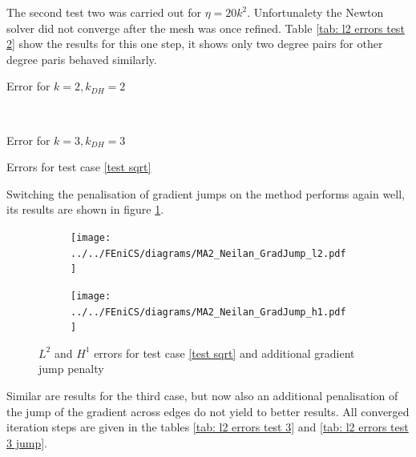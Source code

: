 The second test two was carried out for $\eta=20k^2$. Unfortunalety the Newton solver did not converge after the mesh was once refined. Table \ref{tab: l2 errors test 2} show the results for this one step, it shows only two degree pairs for other degree paris behaved similarly.


\begin{table}[H]
	\begin{subtable}[b]{0.45\textwidth}
		\centering
    	\caption{Error for $k=2, k_{DH}=2$}
   \end{subtable}
   ~
	\begin{subtable}[b]{0.45\textwidth}
		\centering
	\caption{Error for $k=3, k_{DH}=3$}
	\end{subtable}
	\caption{Errors for test case \ref{test sqrt}}
	\label{tab: l2 errors test 2}
\end{table}

Switching the penalisation of gradient jumps on the method performs again well, its results are shown in figure \ref{fig: l2 errors test 2 jump}. 

\begin{figure}[H]
\centering
\begin{subfigure}{\textwidth}
\centering
	\texttt{[image: ../../FEniCS/diagrams/MA2\_Neilan\_GradJump\_l2.pdf]}
\end{subfigure}

\begin{subfigure}{\textwidth}
\centering
	\texttt{[image: ../../FEniCS/diagrams/MA2\_Neilan\_GradJump\_h1.pdf]}
\end{subfigure}
	\caption{$L^2$ and $H^1$ errors for test case \ref{test sqrt} and additional gradient jump penalty}
	\label{fig: l2 errors test 2 jump}
\end{figure}

Similar are results for the third case, but now also an additional penalisation of the jump of the gradient across edges do not yield to better results. All converged iteration steps are given in the tables \ref{tab: l2 errors test 3} and \ref{tab: l2 errors test 3 jump}. 

